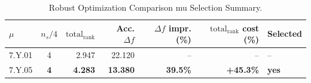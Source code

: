 \begin{table}[ht]
\centering
\footnotesize
\caption{Robust Optimization Comparison mu Selection Summary.}
\label{tab:robust_comparison_mu_selection}
\begin{tabular}{@{}lcrrrrl@{}}
\hline
    \textbf{$\mu$} & \textbf{$n_s/4$} & \textbf{$\text{total}_{\text{rank}}$} & \textbf{Acc. $\Delta f$} & \textbf{$\Delta f$ impr. (\%)} & \textbf{$\text{total}_{\text{rank}}$ cost (\%)} & \textbf{Selected} \\
\hline
    7.Y.01 & 4 & 2.947 & 22.120 & -- & -- & -- \\
    7.Y.05 & \textbf{4} & \textbf{4.283} & \textbf{13.380} & \textbf{39.5\%} & \textbf{+45.3\%} & \textbf{yes} \\
\hline
\end{tabular}
\end{table}